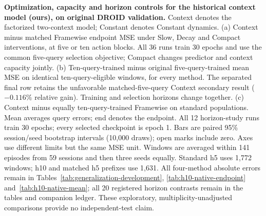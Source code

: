 \textbf{Optimization, capacity and horizon controls for the historical context model (ours), on original DROID validation.}
Context denotes the factorized two-context model; Constant denotes Constant dynamics.
(a) Context minus matched Framewise endpoint MSE under Slow, Decay and Compact interventions, at five or ten action blocks. All 36 runs train 30 epochs and use the common five-query selection objective; Compact changes predictor and context capacity jointly.
(b) Ten-query-trained minus original five-query-trained mean MSE on identical ten-query-eligible windows, for every method. The separated final row retains the unfavorable matched-five-query Context secondary result ($-0.116\%$ relative gain). Training and selection horizons change together.
(c) Context minus equally ten-query-trained Framewise on standard populations. Mean averages query errors; end denotes the endpoint. All 12 horizon-study runs train 30 epochs; every selected checkpoint is epoch 1.
Bars are paired 95\% session/seed bootstrap intervals (10,000 draws); open marks include zero. Axes use different limits but the same MSE unit. Windows are averaged within 141 episodes from 59 sessions and then three seeds equally. Standard h5 uses 1,772 windows; h10 and matched h5 prefixes use 1,631.
All four-method absolute errors remain in Tables~\ref{tab:generalization-development}, \ref{tab:h10-native-endpoint} and~\ref{tab:h10-native-mean}; all 20 registered horizon contrasts remain in the tables and companion ledger. These exploratory, multiplicity-unadjusted comparisons provide no independent-test claim.
